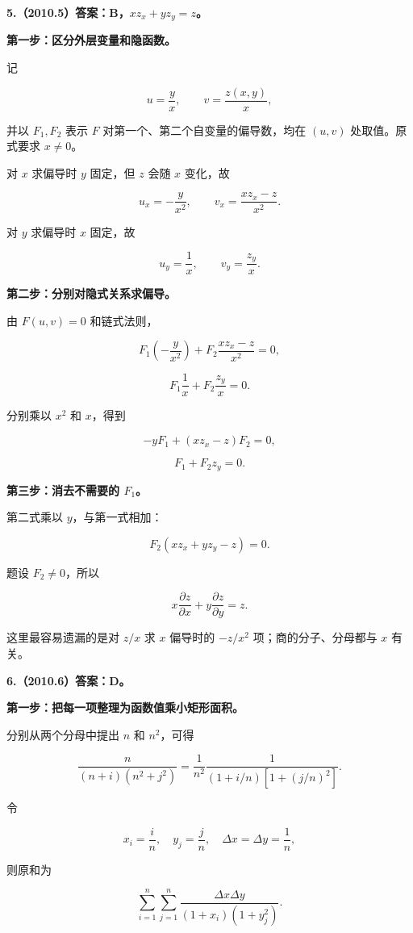 \documentclass[UTF8,11pt,fontset=windows]{ctexart}
\begin{document}
\textbf{5.（2010.5）答案：B，$xz_x+yz_y=z$。}

\textbf{第一步：区分外层变量和隐函数。}

记

$$
u=\frac yx,\qquad v=\frac{z(x,y)}x,
$$

并以 $F_1,F_2$ 表示 $F$ 对第一个、第二个自变量的偏导数，均在 $(u,v)$ 处取值。原式要求 $x\ne0$。

对 $x$ 求偏导时 $y$ 固定，但 $z$ 会随 $x$ 变化，故

$$
u_x=-\frac y{x^2},
\qquad v_x=\frac{xz_x-z}{x^2}.
$$

对 $y$ 求偏导时 $x$ 固定，故

$$
u_y=\frac1x,\qquad v_y=\frac{z_y}x.
$$

\textbf{第二步：分别对隐式关系求偏导。}

由 $F(u,v)=0$ 和链式法则，

$$
F_1\left(-\frac y{x^2}\right)+F_2\frac{xz_x-z}{x^2}=0,
$$

$$
F_1\frac1x+F_2\frac{z_y}x=0.
$$

分别乘以 $x^2$ 和 $x$，得到

$$
-yF_1+(xz_x-z)F_2=0,
$$

$$
F_1+F_2z_y=0.
$$

\textbf{第三步：消去不需要的 $F_1$。}

第二式乘以 $y$，与第一式相加：

$$
F_2(xz_x+yz_y-z)=0.
$$

题设 $F_2\ne0$，所以

$$
\boxed{x\frac{\partial z}{\partial x}+y\frac{\partial z}{\partial y}=z}.
$$

这里最容易遗漏的是对 $z/x$ 求 $x$ 偏导时的 $-z/x^2$ 项；商的分子、分母都与 $x$ 有关。

\clearpage

\textbf{6.（2010.6）答案：D。}

\textbf{第一步：把每一项整理为函数值乘小矩形面积。}

分别从两个分母中提出 $n$ 和 $n^2$，可得

$$
\frac{n}{(n+i)(n^2+j^2)}
=\frac1{n^2}\frac1{(1+i/n)[1+(j/n)^2]}.
$$

令

$$
x_i=\frac in,\quad y_j=\frac jn,
\quad \Delta x=\Delta y=\frac1n,
$$

则原和为

$$
\sum_{i=1}^n\sum_{j=1}^n
\frac{\Delta x\Delta y}{(1+x_i)(1+y_j^2)}.
$$
\end{document}
